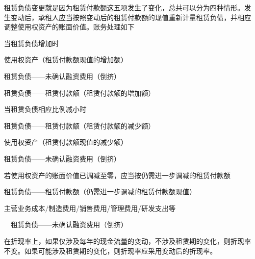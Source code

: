 \documentclass[UTF8,12pt]{ctexart}
\newenvironment{Dr}{%
	\begin{list}{}%
		{
			\setlength{\leftmargin}{2em}
			\setlength{\labelwidth}{2em}
			\setlength{\labelsep}{0pt}
			\setlength{\itemindent}{0pt}
			\setlength{\listparindent}{0pt}
			\setlength{\parsep}{0pt}
			\setlength{\topsep}{0pt}
		}
		\item[\textbf{借：}]
	}{%
	\end{list}
}
\newenvironment{Cr}{%
	\begin{list}{}%
		{
			\setlength{\leftmargin}{3em}
			\setlength{\labelwidth}{2em}
			\setlength{\labelsep}{0pt}
			\setlength{\itemindent}{0pt}
			\setlength{\listparindent}{0pt}
			\setlength{\parsep}{0pt}
			\setlength{\topsep}{0pt}
		}
		\item[\textbf{贷：}]
	}{%
	\end{list}
}
\numberwithin{equation}{section} %
\numberwithin{figure}{section}
\numberwithin{table}{section}
\begin{document}
	租赁负债变更就是因为租赁付款额这五项发生了变化，总共可以分为四种情形。发生变动后，承租人应当按照变动后的租赁付款额的现值重新计量租赁负债，并相应调整使用权资产的账面价值。账务处理如下
	
	当租赁负债增加时
	
	\begin{Dr}
		使用权资产（租赁付款额现值的增加额） 
		
		租赁负债——未确认融资费用（倒挤）
	\end{Dr}
	\begin{Cr}
		租赁负债——租赁付款额（租赁付款额的增加额）
	\end{Cr}

	当租赁负债相应比例减小时
	
	\begin{Dr}
		租赁负债——租赁付款额（租赁付款额的减少额）
	\end{Dr}
	\begin{Cr}
		使用权资产（租赁付款额现值的减少额） 
		
		租赁负债——未确认融资费用（倒挤）
	\end{Cr}

	若使用权资产的账面价值已调减至零，应当按仍需进一步调减的租赁付款额
	
	\begin{Dr}
		租赁负债——租赁付款额（仍需进一步调减的租赁付款额现值）
	\end{Dr}
	\begin{Cr}
		主营业务成本/制造费用/销售费用/管理费用/研发支出等
		
		\ \ 租赁负债——未确认融资费用（倒挤）
	\end{Cr}
	
	在折现率上，如果仅涉及每年的现金流量的变动，不涉及租赁期的变化，则折现率不变。如果可能涉及租赁期的变化，则折现率应采用变动后的折现率。
\end{document}
